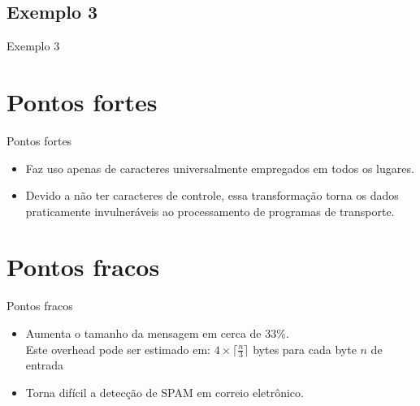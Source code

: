 \documentclass[pdf]{beamer}
\begin{document}
\subsection{Exemplo 3}
\begin{frame}{Exemplo 3}
\transdissolve
\begin{table}
\begin{center}
\end{center}
\end{table}
\end{frame}
\section{Pontos fortes}
\begin{frame}{Pontos fortes}
\transdissolve
\begin{itemize}
\item Faz uso apenas de caracteres universalmente empregados em todos os lugares.
\item Devido a não ter caracteres de controle, essa transformação torna os dados praticamente invulneráveis ao processamento de programas de transporte.
\end{itemize}
\end{frame}
\section{Pontos fracos}
\begin{frame}{Pontos fracos}
\transdissolve
\begin{itemize}
\item Aumenta o tamanho da mensagem em cerca de 33\%. \\
Este overhead pode ser estimado em: $4 \times \lceil \frac{n}{3} \rceil$ bytes para cada byte $n$ de entrada
\item Torna difícil a detecção de SPAM em correio eletrônico.
\end{itemize}
\end{frame}
\end{document}
